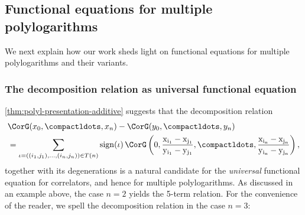 \documentclass[a4paper]{amsart}
\begin{document}
\subsection{Functional equations for multiple polylogarithms} \label{sec:functional equations} We next explain how our work sheds light on functional equations for multiple polylogarithms and their variants.

\subsubsection{The decomposition relation as universal functional equation}
\cref{thm:polyl-presentation-additive} suggests that the decomposition relation  
\begin{align*}
    &\CorG(x_0,\compactldots,x_n)-\CorG(y_0,\compactldots,y_n)\\
     &=\sum_{\iota=((i_1,j_1),\dots,(i_{n},j_n))\in T(n)}\rm{sign}(\iota)\,
     \CorG\left(0,\frac{x_{i_1}-x_{j_1}}{y_{i_1}-y_{j_1}},\compactldots,\frac{x_{i_n}-x_{j_n}}{y_{i_n}-y_{j_n}}\right),
\end{align*}
together with its degenerations is a natural candidate for the \emph{universal} functional equation for correlators, and hence for multiple polylogarithms. As discussed in an example above, the case $n=2$ yields the 5-term relation. For the convenience of the reader, we spell the decomposition relation in the case $n=3$: 
\end{document}
